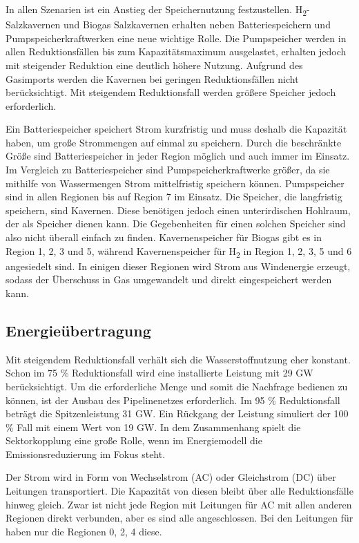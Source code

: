 In allen Szenarien ist ein Anstieg der Speichernutzung festzustellen. H\textsubscript{2}-Salzkavernen und Biogas Salzkavernen erhalten neben Batteriespeichern und Pumpspeicherkraftwerken eine neue wichtige Rolle. Die Pumpspeicher werden in allen Reduktionsfällen bis zum Kapazitätsmaximum ausgelastet, erhalten jedoch mit steigender Reduktion eine deutlich höhere Nutzung. 
Aufgrund des Gasimports werden die Kavernen bei geringen Reduktionsfällen nicht berücksichtigt. Mit steigendem Reduktionsfall werden größere Speicher jedoch erforderlich.

Ein Batteriespeicher speichert Strom kurzfristig und muss deshalb die Kapazität haben, um große Strommengen auf einmal zu speichern. Durch die beschränkte Größe sind Batteriespeicher in jeder Region möglich und auch immer im Einsatz.
Im Vergleich zu Batteriespeicher sind Pumpspeicherkraftwerke größer, da sie mithilfe von Wassermengen Strom mittelfristig speichern können. Pumpspeicher sind in allen Regionen bis auf Region 7 im Einsatz.
Die Speicher, die langfristig speichern, sind Kavernen. Diese benötigen jedoch einen unterirdischen Hohlraum, der als Speicher dienen kann. Die Gegebenheiten für einen solchen Speicher sind also nicht überall einfach zu finden. Kavernenspeicher für Biogas gibt es in Region 1, 2, 3 und 5, während Kavernenspeicher für H\textsubscript{2} in Region 1, 2, 3, 5 und 6 angesiedelt sind. In einigen dieser Regionen wird Strom aus Windenergie erzeugt, sodass der Überschuss in Gas umgewandelt und direkt eingespeichert werden kann.


\subsection{Energieübertragung}
Mit steigendem Reduktionsfall verhält sich die Wasserstoffnutzung eher konstant. Schon im 75 \% Reduktionsfall wird eine installierte Leistung mit 29 GW berücksichtigt. Um die erforderliche Menge und somit die Nachfrage bedienen zu können, ist der Ausbau des Pipelinenetzes erforderlich. Im 95 \% Reduktionsfall beträgt die Spitzenleistung 31 GW. Ein Rückgang der Leistung simuliert der 100 \% Fall mit einem Wert von 19 GW. In dem Zusammenhang spielt die Sektorkopplung eine große Rolle, wenn im Energiemodell die Emissionsreduzierung im Fokus steht. 

Der Strom wird in Form von Wechselstrom (AC) oder Gleichstrom (DC) über Leitungen transportiert. Die Kapazität von diesen bleibt über alle Reduktionsfälle hinweg gleich. Zwar ist nicht jede Region mit Leitungen für AC mit allen anderen Regionen direkt verbunden, aber es sind alle angeschlossen. Bei den Leitungen für haben nur die Regionen 0, 2, 4 diese.

